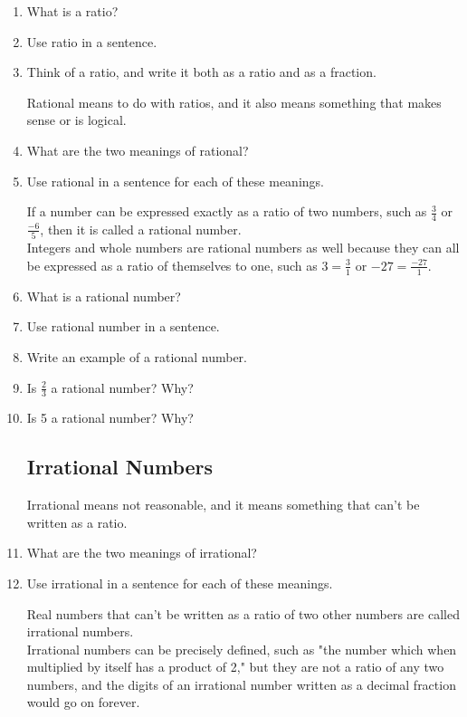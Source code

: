 \documentclass{article}
\begin{document}
\begin{enumerate}
\item What is a ratio?
\item Use ratio in a sentence.
\item Think of a ratio, and write it both as a ratio and as a fraction.

Rational means to do with ratios, and it also means something that makes sense or is logical.

\item What are the two meanings of rational?
\item Use rational in a sentence for each of these meanings.

If a number can be expressed exactly as a ratio of two numbers, such as $\frac{3}{4}$ or $\frac{-6}{5}$, then it is called a rational number.\\

Integers and whole numbers are rational numbers as well because they can all be expressed as a ratio of themselves to one, such as $3=\frac{3}{1}$ or $-27=\frac{-27}{1}$.\\

\item What is a rational number?
\item Use rational number in a sentence.
\item Write an example of a rational number.
\item Is $\frac{2}{3}$ a rational number? Why?
\item Is 5 a rational number? Why?

\subsection*{Irrational Numbers}

Irrational means not reasonable, and it means something that can't be written as a ratio.

\item What are the two meanings of irrational?
\item Use irrational in a sentence for each of these meanings.

Real numbers that can't be written as a ratio of two other numbers are called irrational numbers.\\

Irrational numbers can be precisely defined, such as "the number which when multiplied by itself has a product of 2," but they are not a ratio of any two numbers, and the digits of an irrational number written as a decimal fraction would go on forever.\\


\end{enumerate}
\end{document}
